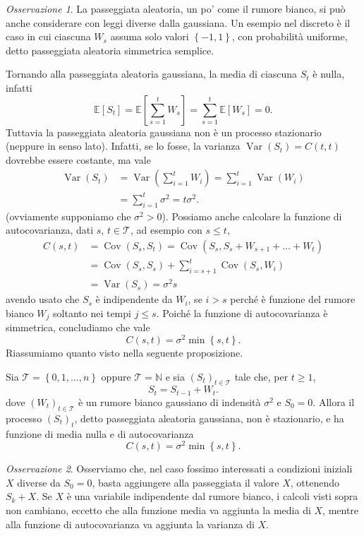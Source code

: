 \documentclass[
  italian,
  letterpaper,
]{book}
\newcommand{\bra}[1]{\left( #1 \right)}
\newcommand{\sqa}[1]{\left[ #1 \right]}
\newcommand{\cur}[1]{\left\{ #1 \right\}}
\newcommand{\E}[1]{\mathbb{E}\sqa{#1}}
\newcommand{\Var}[1]{\operatorname{Var}\bra{#1}}
\newcommand{\Cov}[1]{\operatorname{Cov}\bra{#1}}
\theoremstyle{definition}
\theoremstyle{remark}
\newtheorem*{remark}{Osservazione}
\begin{document}
\begin{remark}
La passeggiata aleatoria, un po' come il rumore bianco, si può anche
considerare con leggi diverse dalla gaussiana. Un esempio nel discreto è
il caso in cui ciascuna \(W_s\) assuma solo valori \(\cur{-1, 1}\), con
probabilità uniforme, detto passeggiata aleatoria simmetrica semplice.
\end{remark}

Tornando alla passeggiata aleatoria gaussiana, la media di ciascuna
\(S_t\) è nulla, infatti
\[ \E{S_t} = \E{ \sum_{s=1}^t W_s} = \sum_{s=1}^t \E{W_s} = 0.\]
Tuttavia la passeggiata aleatoria gaussiana non è un processo
stazionario (neppure in senso lato). Infatti, se lo fosse, la varianza
\(\Var{S_t} = C(t,t)\) dovrebbe essere costante, ma vale
\[ \begin{split} \Var{S_t} & = \Var{ \sum_{i=1}^ t W_i } = \sum_{i=1}^t \Var{W_i} \\
& = \sum_{i=1}^t \sigma^2  = t \sigma^2.\end{split}\] (ovviamente
supponiamo che \(\sigma^2>0\)). Possiamo anche calcolare la funzione di
autocovarianza, dati \(s\), \(t \in \mathcal{T}\), ad esempio con
\(s \le t\),
\[ \begin{split} C(s,t) &= \Cov{S_s, S_t} = \Cov{ S_s, S_s + W_{s+1}+\ldots + W_{t}}\\
& = \Cov{ S_s, S_s } + \sum_{i=s+1}^t \Cov{S_s,  W_{i}}\\
& = \Var{S_s} = \sigma^2 s
\end{split}\] avendo usato che \(S_s\) è indipendente da \(W_i\), se
\(i>s\) perché è funzione del rumore bianco \(W_j\) soltanto nei tempi
\(j \le s\). Poiché la funzione di autocovarianza è simmetrica,
concludiamo che vale \[ C(s,t) = \sigma^2  \min\cur{s,t}.\] Riassumiamo
quanto visto nella seguente proposizione.

Sia \(\mathcal{T} = \cur{0,1, \ldots, n}\) oppure
\(\mathcal{T} = \mathbb{N}\) e sia \((S_t)_{t \in \mathcal{T}}\) tale
che, per \(t \ge 1\), \[  S_t =  S_{t-1} + W_t.\] dove
\((W_t)_{t \in \mathcal{T}}\) è un rumore bianco gaussiano di indensità
\(\sigma^2\) e \(S_0=0\). Allora il processo \((S_t)_{t}\), detto
passeggiata aleatoria gaussiana, non è stazionario, e ha funzione di
media nulla e di autocovarianza \[ C(s,t) =\sigma^2 \min\cur{s,t}.\]

\begin{remark}
Osserviamo che, nel caso fossimo interessati a condizioni iniziali \(X\)
diverse da \(S_0 =0\), basta aggiungere alla passeggiata il valore
\(X\), ottenendo \(S_k+X\). Se \(X\) è una variabile indipendente dal
rumore bianco, i calcoli visti sopra non cambiano, eccetto che alla
funzione media va aggiunta la media di \(X\), mentre alla funzione di
autocovarianza va aggiunta la varianza di \(X\).
\end{remark}
\end{document}

